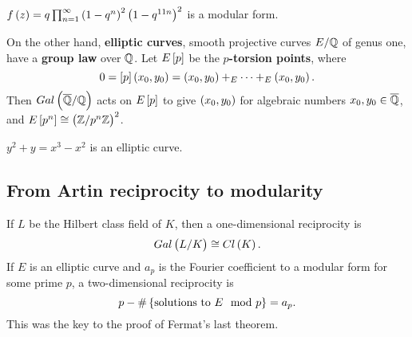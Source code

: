 \begin{example*}
$ f\br{z} = q\prod_{n = 1}^\infty \br{1 - q^n}^2\br{1 - q^{11n}}^2 $ is a modular form.
\end{example*}

On the other hand, \textbf{elliptic curves}, smooth projective curves $ E / \mathbb{Q} $ of genus one, have a \textbf{group law} over $ \mathbb{Q} $. Let $ E\sbr{p} $ be the \textbf{$ p $-torsion points}, where
$$ 0 = \sbr{p}\br{x_0, y_0} = \br{x_0, y_0} +_E \dots +_E \br{x_0, y_0}. $$
Then $ Gal\br{\overline{\Q} / \Q} $ acts on $ E\sbr{p} $ to give $ \br{x_0, y_0} $ for algebraic numbers $ x_0, y_0 \in \overline{\mathbb{Q}} $, and $ E\sbr{p^n} \cong \br{\Z / p^n\Z}^2 $.

\begin{example*}
$ y^2 + y = x^3 - x^2 $ is an elliptic curve.
\end{example*}

\subsection{From Artin reciprocity to modularity}

If $ L $ be the Hilbert class field of $ K $, then a one-dimensional reciprocity is
$$ Gal\br{L / K} \cong Cl\br{K}. $$
If $ E $ is an elliptic curve and $ a_p $ is the Fourier coefficient to a modular form for some prime $ p $, a two-dimensional reciprocity is
$$ p - \#\cbr{\text{solutions to} \ E \mod p} = a_p. $$
This was the key to the proof of Fermat's last theorem.


